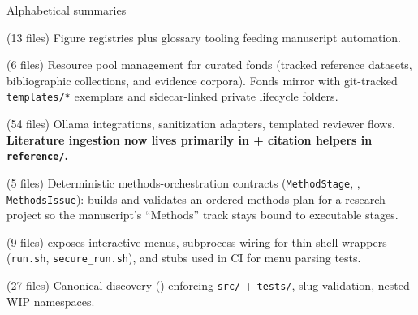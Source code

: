 \documentclass[
  ignorenonframetext,
]{beamer}
\begin{document}
\begin{frame}{Alphabetical summaries}
\begin{block}{ (13 files)}
\protect{}\label{infrastructure.documentation-13-files}
Figure registries plus glossary tooling feeding manuscript automation.
\end{block}

\begin{block}{ (6 files)}
\protect{}\label{infrastructure.fonds-6-files}
Resource pool management for curated fonds (tracked reference datasets,
bibliographic collections, and evidence corpora). Fonds mirror
 with git-tracked \texttt{templates/*}
exemplars and sidecar-linked private lifecycle folders.
\end{block}

\begin{block}{ (54 files)}
\protect{}\label{infrastructure.llm-54-files}
Ollama integrations, sanitization adapters, templated reviewer flows.
\textbf{Literature ingestion now lives primarily in
 + citation helpers in \texttt{reference/}.}
\end{block}

\begin{block}{ (5 files)}
\protect{}\label{infrastructure.methods-5-files}
Deterministic methods-orchestration contracts (\texttt{MethodStage},
, \texttt{MethodsIssue}): builds and
validates an ordered methods plan for a research project so the
manuscript's ``Methods'' track stays bound to executable stages.
\end{block}

\begin{block}{ (9 files)}
\protect{}\label{infrastructure.orchestration-9-files}
 exposes interactive
menus, subprocess wiring for thin shell wrappers (\texttt{run.sh},
\texttt{secure\_run.sh}), and stubs used in CI for menu parsing tests.
\end{block}

\begin{block}{ (27 files)}
\protect{}\label{infrastructure.project-27-files}
Canonical discovery () enforcing
\texttt{src/} + \texttt{tests/}, slug validation, nested WIP namespaces.
\end{block}


\end{frame}
\end{document}

